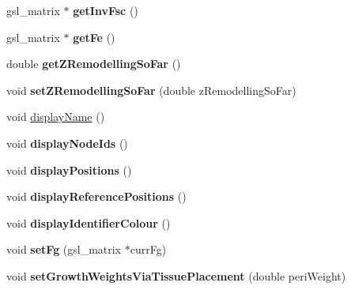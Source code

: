 \begin{DoxyCompactItemize}
\item 
\hypertarget{classShapeBase_a884da8f201986aaef5c27efdd4a5b7d4}{}gsl\+\_\+matrix $\ast$ {\bfseries get\+Inv\+Fsc} ()\label{classShapeBase_a884da8f201986aaef5c27efdd4a5b7d4}

\item 
\hypertarget{classShapeBase_a26de227e5135a355667be3a2a86d1431}{}gsl\+\_\+matrix $\ast$ {\bfseries get\+Fe} ()\label{classShapeBase_a26de227e5135a355667be3a2a86d1431}

\item 
\hypertarget{classShapeBase_a4916a23d305f1258ec83b7e53adabea1}{}double {\bfseries get\+Z\+Remodelling\+So\+Far} ()\label{classShapeBase_a4916a23d305f1258ec83b7e53adabea1}

\item 
\hypertarget{classShapeBase_ad225c2235e531e5ee239a127bbf92def}{}void {\bfseries set\+Z\+Remodelling\+So\+Far} (double z\+Remodelling\+So\+Far)\label{classShapeBase_ad225c2235e531e5ee239a127bbf92def}

\item 
void \hyperlink{classShapeBase_ab8a7323c50767ecdc82d8d8ce411b264}{display\+Name} ()
\item 
\hypertarget{classShapeBase_a324f8fd5dd90c14b621b2f2ee3ec98db}{}void {\bfseries display\+Node\+Ids} ()\label{classShapeBase_a324f8fd5dd90c14b621b2f2ee3ec98db}

\item 
\hypertarget{classShapeBase_aca4d0f70caf459dc93f914ef7fc2a053}{}void {\bfseries display\+Positions} ()\label{classShapeBase_aca4d0f70caf459dc93f914ef7fc2a053}

\item 
\hypertarget{classShapeBase_af2d221cf63220dad3ecf139ffa164698}{}void {\bfseries display\+Reference\+Positions} ()\label{classShapeBase_af2d221cf63220dad3ecf139ffa164698}

\item 
\hypertarget{classShapeBase_aba6bb76d8adffaeb7ad36cce8a3f17ab}{}void {\bfseries display\+Identifier\+Colour} ()\label{classShapeBase_aba6bb76d8adffaeb7ad36cce8a3f17ab}

\item 
\hypertarget{classShapeBase_ad39c3f3a555a89e106c4afaaf81c72f6}{}void {\bfseries set\+Fg} (gsl\+\_\+matrix $\ast$curr\+Fg)\label{classShapeBase_ad39c3f3a555a89e106c4afaaf81c72f6}

\item 
\hypertarget{classShapeBase_a38a100fb162232636bf666eb1603f023}{}void {\bfseries set\+Growth\+Weights\+Via\+Tissue\+Placement} (double peri\+Weight)\label{classShapeBase_a38a100fb162232636bf666eb1603f023}


\end{DoxyCompactItemize}
